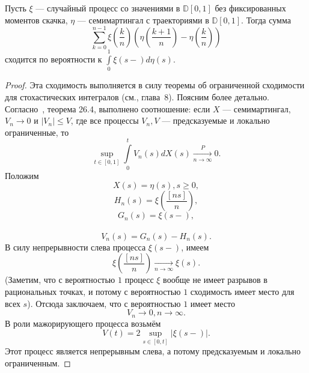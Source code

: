 \documentclass[12pt, a4paper, titlepage]{article}
\begin{document}
\begin{lem}\label{integralDominatedConvergenceLem}
Пусть $\xi$ --- случайный процесс со значениями в $\mathbb{D}[0,1]$
без фиксированных моментов скачка, 
$\eta$ --- семимартингал с траекториями в $\mathbb{D}[0,1]$. 
Тогда сумма
$$\sum\limits_{k=0}^{n-1}\xi\left(\frac{k}{n}\right)\left(\eta\left(\frac{k+1}{n}\right)-
\eta\left(\frac{k}{n}\right)\right)$$
сходится по вероятности к $\int\limits_0^1 \xi(s-)d\eta(s).$
\end{lem}
\begin{proof}
 Эта сходимость выполняется в силу теоремы об ограниченной сходимости для стохастических
 интегралов (см.\cite{Meyer}, глава~8).
Поясним более детально. Согласно~\cite{Kallenberg}, теорема 26.4, выполнено
соотношение:
если $X$ --- семимартингал,
$V_n\to 0$ и $|V_n|\le V$, где все процессы $V_n, V$ --- предсказуемые и локально
ограниченные, то 
$$\sup\limits_{t \in [0,1]}\int\limits_0^t V_n(s)dX(s)\xrightarrow[n\to\infty]{P}0.$$
Положим
$$X(s)=\eta(s),s \ge 0,$$
$$H_n(s)=\xi\left(\frac{[ns]}{n}\right),$$
$$G_n(s)=\xi(s-),$$\
$$V_n(s)=G_n(s)-H_n(s).$$
В силу непрерывности слева процесса $\xi(s-)$, имеем
$$\xi\left(\frac{[ns]}{n}\right)\xrightarrow[n\to\infty]{}\xi(s).$$
(Заметим, что с вероятностью $1$ процесс $\xi$ вообще не имеет разрывов в рациональных
точках, и потому с вероятностью $1$ сходимость имеет место для всех $s$).
Отсюда заключаем, что с вероятностью $1$ имеет место 
$$V_n\to 0, n \to \infty.$$
В роли мажорирующего процесса возьмём
$$V(t)=2\sup\limits_{s\in [0,t]}|\xi(s-)|.$$
Этот процесс является непрерывным слева, а потому предсказуемым и локально ограниченным. 
\end{proof}
\end{document}
